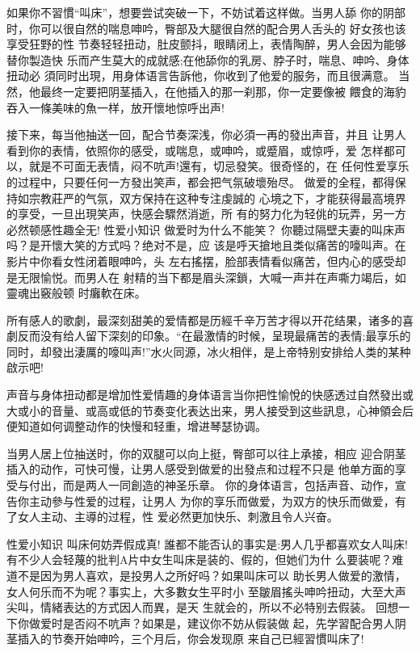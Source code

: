 \documentclass[12pt,UTF8]{ctexbook}
\begin{document}
如果你不習慣“叫床”，想要尝试突破一下，不妨试着这样做。当男人舔
你的阴部时，你可以很自然的喘息呻吟，臀部及大腿很自然的配合男人舌头的
好女孩也该享受狂野的性
节奏轻轻扭动，肚皮颤抖，眼睛闭上，表情陶醉，男人会因为能够替你製造快
乐而产生莫大的成就感;在他舔你的乳房、脖子时，喘息、呻吟、身体扭动必
須同时出現，用身体语言告訴他，你收到了他爱的服务，而且很满意。
当然，他最终一定要把阴茎插入，在他插入的那一刹那，你一定要像被
餵食的海豹吞入一條美味的魚一样，放开懷地惊呼出声!

接下来，每当他抽送一回，配合节奏深浅，你必須一再的發出声音，并且
让男人看到你的表情，依照你的感受，或喘息，或呻吟，或蹙眉，或惊呼，爱
怎样都可以，就是不可面无表情，闷不吭声!還有，切忌發笑。很奇怪的，在
任何性爱享乐的过程中，只要任何一方發出笑声，都会把气氛破壞殆尽。
做爱的全程，都得保持如宗教莊严的气氛，双方保持在这种专注虔誠的
心境之下，才能获得最高境界的享受，一旦出現笑声，快感会驟然消逝，所
有的努力化为轻佻的玩弄，另一方必然顿感性趣全无!
性爱小知识
做爱时为什么不能笑？
你聽过隔壁夫妻的叫床声吗？是开懷大笑的方式吗？绝对不是，应
该是呼天搶地且类似痛苦的嚎叫声。在影片中你看女性闭着眼呻吟，头
左右搖摆，脸部表情看似痛苦，但内心的感受却是无限愉悦。而男人在
射精的当下都是眉头深鎖，大喊一声并在声嘶力竭后，如靈魂出竅般顿
时癱軟在床。

所有感人的歌劇，最深刻甜美的爱情都是历經千辛万苦才得以开花结果，诸多的喜劇反而没有给人留下深刻的印象。“在最激情的时候，呈現最痛苦的表情;最享乐的同时，却發出淒厲的嚎叫声!”水火同源，冰火相伴，是上帝特别安排给人类的某种啟示吧!

声音与身体扭动都是增加性爱情趣的身体语言当你把性愉悅的快感透过自然發出或大或小的音量、或高或低的节奏变化表达出来，男人接受到这些訊息，心神領会后便知道如何调整动作的快慢和轻重，增进琴瑟协调。

当男人居上位抽送时，你的双腿可以向上挺，臀部可以往上承接，相应
迎合阴茎插入的动作，可快可慢，让男人感受到做爱的出發点和过程不只是
他单方面的享受与付出，而是两人一同創造的神圣乐章。
你的身体语言，包括声音、动作，宣告你主动參与性爱的过程，让男人
为你的享乐而做爱，为双方的快乐而做爱，有了女人主动、主導的过程，性
爱必然更加快乐、刺激且令人兴奋。

性爱小知识
叫床何妨弄假成真!
誰都不能否认的事实是:男人几乎都喜欢女人叫床!
有不少人会轻蔑的批判A片中女生叫床是装的、假的，但她们为什
么要装呢？难道不是因为男人喜欢，是投男人之所好吗？如果叫床可以
助长男人做爱的激情，女人何乐而不为呢？事实上，大多數女生平时小
至皺眉搖头呻吟扭动，大至大声尖叫，情緒表达的方式因人而異，是天
生就会的，所以不必特别去假装。
回想一下你做爱时是否闷不吭声？如果是，建议你不妨从假装做
起，先学習配合男人阴茎插入的节奏开始呻吟，三个月后，你会发现原
来自己已經習慣叫床了!
\end{document}
